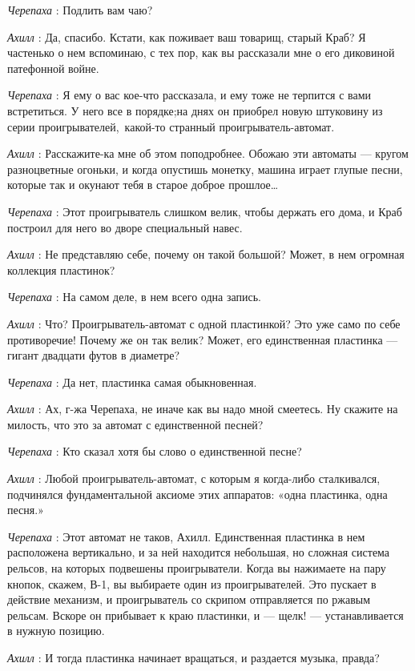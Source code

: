 \emph{Черепаха} : Подлить вам чаю?

\emph{Ахилл} : Да, спасибо. Кстати, как поживает ваш товарищ, старый Краб? Я частенько о нем вспоминаю, с тех пор, как вы рассказали мне о его диковиной патефонной войне.

\emph{Черепаха} : Я ему о вас кое-что рассказала, и ему тоже не терпится с вами встретиться. У него все в порядке;на днях он приобрел новую штуковину из серии проигрывателей,~какой-то странный проигрыватель-автомат.

\emph{Ахилл} : Расскажите-ка мне об этом поподробнее. Обожаю эти автоматы --- кругом разноцветные огоньки, и когда опустишь монетку, машина играет глупые песни, которые так и окунают тебя в старое доброе прошлое\ldots{}

\emph{Черепаха} : Этот проигрыватель слишком велик, чтобы держать его дома, и Краб построил для него во дворе специальный навес.

\emph{Ахилл} : Не представляю себе, почему он такой большой? Может, в нем огромная коллекция пластинок?

\emph{Черепаха} : На самом деле, в нем всего одна запись.

\emph{Ахилл} : Что? Проигрыватель-автомат с одной пластинкой? Это уже само по себе противоречие! Почему же он так велик? Может, его единственная пластинка --- гигант двадцати футов в диаметре?

\emph{Черепаха} : Да нет, пластинка самая обыкновенная.

\emph{Ахилл} : Ах, г-жа Черепаха, не иначе как вы надо мной смеетесь. Ну скажите на милость, что это за автомат с единственной песней?

\emph{Черепаха} : Кто сказал хотя бы слово о единственной песне?

\emph{Ахилл} : Любой проигрыватель-автомат, с которым я когда-либо сталкивался, подчинялся фундаментальной аксиоме этих аппаратов: «одна пластинка, одна песня.»

\emph{Черепаха} : Этот автомат не таков, Ахилл. Единственная пластинка в нем расположена вертикально, и за ней находится небольшая, но сложная система рельсов, на которых подвешены проигрыватели. Когда вы нажимаете на пару кнопок, скажем, В-1, вы выбираете один из проигрывателей. Это пускает в действие механизм, и проигрыватель со скрипом отправляется по ржавым рельсам. Вскоре он прибывает к краю пластинки, и --- щелк! --- устанавливается в нужную позицию.

\emph{Ахилл} : И тогда пластинка начинает вращаться, и раздается музыка, правда?

